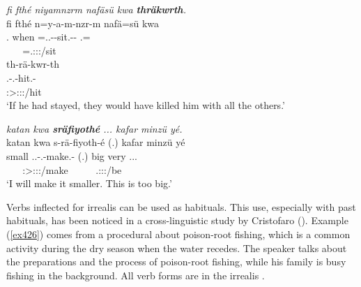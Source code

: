 \begin{exe}
	\ex \emph{fi fthé niyamnzrm nafäsü kwa \textbf{thräkwrth}.}\\
	\glll fi fthé n=y-a-m-nzr-m nafä=sü kwa\\
	\Third.{\Abs} when \Immpst=\Tsg.\Masc.\Alph-\Vc-sit.\Ext-\Ndu-\Dur{} \Third\Assoc.\Pl=\Etc{} {\Fut}\\
	~ ~ {\footnotesize \Immpst=\Tsg.\Masc:\Sbj:\Nonpast:\Dur/sit} ~ ~\\
	\sn
	\glll th-rä-kwr-th\\
	\Stsg.\Bet-\Irr.\Ndu-hit.\Rs-\Stnsg{}\\
	{\footnotesize \Stpl:\Sbj>\Stpl:\Obj:\Irr:\Pfv/hit}\\
	\trans `If he had stayed, they would have killed him with all the others.'\\ 
	\label{ex381}
\end{exe}
\begin{exe}
	\ex \emph{katan kwa \textbf{sräfiyothé} ... kafar minzü yé.}\\
	\glll katan kwa s-rä-fiyoth-é (.) kafar minzü yé\\
	small {\Fut} \Tsg.\Masc.\Bet-\Vc.\Ndu-make.\Rs-\Fsg{} (.) big very \Tsg.\Masc.\Cop.{\Ndu}\\
	~ ~ {\footnotesize \Fsg:\Sbj>\Tsg:\Obj:\Irr:\Pfv/make} ~ ~ ~ {\footnotesize \Tsg.\Masc:\Sbj:\Nonpast:\Ipfv/be}\\
	\trans `I will make it smaller. This is too big.' 
	\label{ex382}
\end{exe}

Verbs inflected for irrealis can be used as habituals. This use, especially with past habituals, has been noticed in a cross-linguistic study by Cristofaro (\citeyear{Cristofaro:2004wi}). Example (\ref{ex426}) comes from a procedural about poison-root fishing, which is a common activity during the dry season when the water recedes. The speaker talks about the preparations and the process of poison-root fishing, while his family is busy fishing in the background. All verb forms are in the irrealis .

